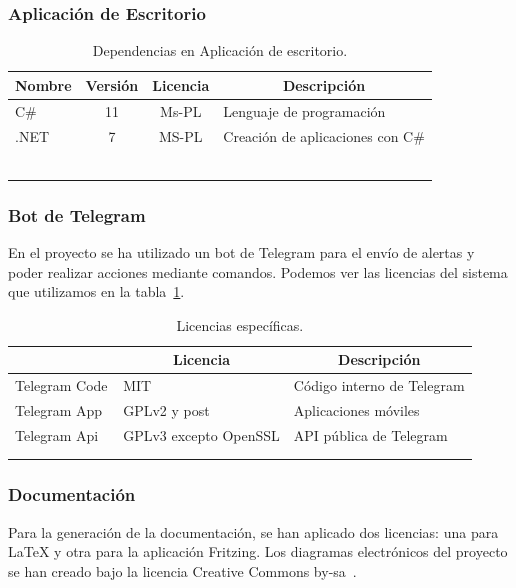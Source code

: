 \subsubsection{Aplicación de Escritorio}
\footnotesize%
\begin{longtable}[c]{@{}lccl@{}}
\toprule
\multicolumn{1}{c}{\textbf{Nombre}} & \textbf{Versión} & \textbf{Licencia} & \multicolumn{1}{c}{\textbf{Descripción}} \\ \midrule
\endfirsthead
%
\endhead
%
\bottomrule
\endfoot
%
\endlastfoot
%
C\# & 11 & Ms-PL & Lenguaje de programación\\
.NET	& 7 & MS-PL & Creación de aplicaciones con C\#\\
\bottomrule~\\
\caption{Dependencias en Aplicación de escritorio.}
\end{longtable}
\normalsize

\subsubsection{Bot de Telegram}

En el proyecto se ha utilizado un bot de Telegram para el envío de alertas y poder realizar acciones mediante comandos. Podemos ver las licencias del sistema que utilizamos en la tabla~\ref{tab:lienciaTelegram}.

\begin{longtable}[c]{@{}lll@{}}
\toprule
\centering
\multicolumn{1}{c}{\textbf{Nombre}} & \multicolumn{1}{c}{\textbf{Licencia}} & \multicolumn{1}{c}{\textbf{Descripción}} \\ \midrule
\endfirsthead
%
\endhead
%
\bottomrule
\endfoot
%
\endlastfoot
%
Telegram Code & MIT & Código interno de Telegram \\
Telegram App~\cite{misc:TelegramApps} & GPLv2 y post & Aplicaciones móviles \\
Telegram Api~\cite{misc:Telegram_api} & GPLv3 excepto OpenSSL & API pública de Telegram \\ \bottomrule \\
\caption{Licencias específicas.}
\label{tab:lienciaTelegram}
\end{longtable}


\subsubsection{Documentación}
Para la generación de la documentación, se han aplicado dos licencias: una para \LaTeX{} y otra para la aplicación Fritzing. Los diagramas electrónicos del proyecto se han creado bajo la licencia Creative Commons by-sa~\cite{wiki:CreativeCommons}.

